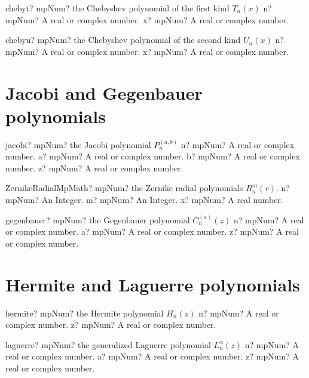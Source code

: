 \documentclass[12pt,a4paper,openany]{book}
\begin{document}
\begin{mpFunctionsExtract}
\mpFunctionTwo
{chebyt? mpNum? the Chebyshev polynomial of the first kind $T_n(x)$}
{n? mpNum? A real or complex number.}
{x? mpNum? A real or complex number.}
\end{mpFunctionsExtract}

\begin{mpFunctionsExtract}
\mpFunctionTwo
{chebyu? mpNum? the Chebyshev polynomial of the second kind $U_n(x)$}
{n? mpNum? A real or complex number.}
{x? mpNum? A real or complex number.}
\end{mpFunctionsExtract}

\section{Jacobi and Gegenbauer polynomials}

\begin{mpFunctionsExtract}
\mpFunctionFour
{jacobi? mpNum? the Jacobi polynomial $P_n^{(a,b)}$}
{n? mpNum? A real or complex number.}
{a? mpNum? A real or complex number.}
{b? mpNum? A real or complex number.}
{z? mpNum? A real or complex number.}
\end{mpFunctionsExtract}

\begin{mpFunctionsExtract}
\mpFunctionThreeNotImplemented
{ZernikeRadialMpMath? mpNum? the Zernike radial polynomials $R^m_n(r)$.}
{n? mpNum? An Integer.}
{m? mpNum? An Integer.}
{x? mpNum? A real number.}
\end{mpFunctionsExtract}

\begin{mpFunctionsExtract}
\mpFunctionThree
{gegenbauer? mpNum? the Gegenbauer polynomial $C_n^{(a)}(z)$}
{n? mpNum? A real or complex number.}
{a? mpNum? A real or complex number.}
{z? mpNum? A real or complex number.}
\end{mpFunctionsExtract}

\section{Hermite and Laguerre polynomials}

\begin{mpFunctionsExtract}
\mpFunctionTwo
{hermite? mpNum? the Hermite polynomial $H_n(z)$}
{n? mpNum? A real or complex number.}
{z? mpNum? A real or complex number.}
\end{mpFunctionsExtract}

\begin{mpFunctionsExtract}
\mpFunctionThree
{laguerre? mpNum? the generalized Laguerre polynomial $L_n^{\alpha}(z)$}
{n? mpNum? A real or complex number.}
{a? mpNum? A real or complex number.}
{z? mpNum? A real or complex number.}
\end{mpFunctionsExtract}
\end{document}
